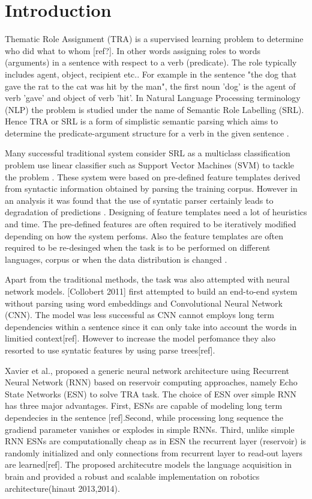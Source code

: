 \chapter{Introduction}\label{introduction}

Thematic Role Assignment (TRA) is a supervised learning problem to determine who did what to whom [ref?]. In other words assigning roles to words (arguments) in a sentence with respect to a verb (predicate). The role typically includes agent, object, recipient etc.. For example in the sentence "the dog that gave the rat to the cat was hit by the man", the first noun 'dog' is the agent of verb 'gave' and object of verb 'hit'. In Natural Language Processing terminology (NLP) the problem is studied under the name of Semantic Role Labelling (SRL). Hence TRA or SRL is a form of simplistic semantic parsing which aims to determine the predicate-argument structure for a verb in the given sentence \cite{end-to-end}.

Many successful traditional system consider SRL as a multiclass classification problem use linear classifier such as Support Vector Machines (SVM) to tackle the problem \cite{Koomen:2005,pradhan:2005}. These system were based on pre-defined feature templates derived from syntactic information obtained by parsing the training corpus. However in an analysis it was found that the use of syntatic parser certainly leads to degradation of predictions \cite{pradhan:2005}. Designing of feature templates need a lot of heuristics and time. The pre-defined features are often required to be iteratively modified depending on how the system perfoms. Also the feature templates are often required to be re-desinged when the task is to be performed on different languages, corpus or when the data distribution is changed \cite{end-to-end}.

Apart from the traditional methods, the task was also attempted with neural network models. [Collobert 2011] first attempted to build an end-to-end system without parsing using word embeddings and Convolutional Neural Network (CNN). The model was less successful as CNN cannot employs long term dependencies within a sentence since it can only take into account the words in limitied context[ref]. However to increase the model perfomance they also resorted to use syntatic features by using parse trees[ref].

Xavier et al., \cite{xavier:2013:RT} proposed a generic neural network architecture using Recurrent Neural Network (RNN) based on reservoir computing approaches, namely Echo State Networks (ESN) to solve TRA task. The choice of ESN over simple RNN has three major advantages. First, ESNs are capable of modeling long term dependecies in the sentence [ref].Second, while processing long sequence the gradiend parameter vanishes or explodes in simple RNNs. Third, unlike simple RNN ESNs are computationally cheap as in ESN the recurrent layer (reservoir) is randomly initialized and only connections from recurrent layer to read-out layers are learned[ref]. The proposed architecutre models the language acquisition in brain and provided a robust and scalable implementation on robotics architecture(hinaut 2013,2014). 

